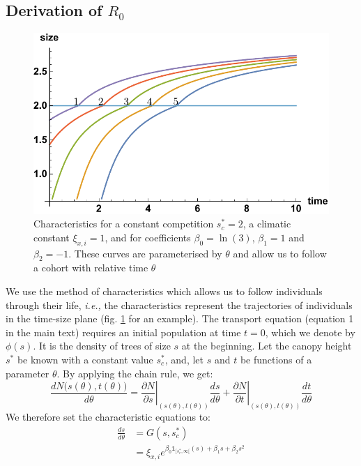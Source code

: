 \documentclass[letterpaper, 12pt]{article}
\newcommand {\ie}{\textit{i.e., }}
\newcommand {\s}{{s}^{*}}
\theoremstyle{theo}
\begin{document}
\begin{refsection}
\begin{onehalfspace}
\subsection{Derivation of $ R_0 $}
\begin{figure}[h!]
	\centering
	\includegraphics[scale = 0.75]{../illustrations/chara}
	\caption[Example of characteristics]{Characteristics for a constant competition $ \s_c = 2 $, a climatic constant $ \xi_{x, i} = 1 $, and for coefficients $ \beta_0 = \ln(3) $, $ \beta_1 = 1 $ and $ \beta_2 = -1 $. These curves are parameterised by $ \theta $ and allow us to follow a cohort with relative time $ \theta $}
	\label{fig::chara}
\end{figure}
We use the method of characteristics \citep{Olver2014b} which allows us to follow individuals through their life, \ie the characteristics represent the trajectories of individuals in the time-size plane (fig. \ref{fig::chara} for an example). The transport equation (equation 1 in the main text) requires an initial population at time $ t = 0 $, which we denote by $ \phi(s) $. It is the density of trees of size $ s $ at the beginning. Let the canopy height $ \s $ be known with a constant value $ \s_c $, and, let $ s $ and $ t $ be functions of a parameter $ \theta $. By applying the chain rule, we get:
\[
	\frac{d N\big(s(\theta), t(\theta) \big)}{d \theta} = \left. \frac{\partial N}{\partial s} \right|_{(s(\theta), t(\theta))} \frac{ds}{d \theta} +
			\left. \frac{\partial N}{\partial t} \right|_{(s(\theta), t(\theta))} \frac{dt}{d \theta}
\]
We therefore set the characteristic equations to:
\begin{align}
	\frac{ds}{d \theta} &= G(s, \s_c) \label{eq::chara_s} \\
		&= \xi_{x, i} e^{\beta_0 \mathbb{1}_{[\s_c, \infty[}(s) + \beta_1 s + \beta_2 s^2} \nonumber \\

\end{align}
\end{onehalfspace}
\end{refsection}
\end{document}
